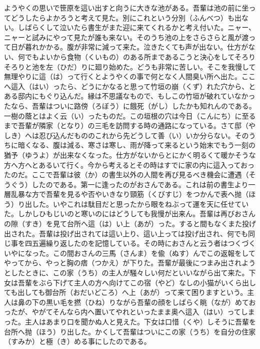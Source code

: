 \documentclass{book}
\begin{document}
ようやくの思いで笹原を這い出すと向うに大きな池がある。吾輩は池の前に坐ってどうしたらよかろうと考えて見た。別にこれという分別（ふんべつ）も出ない。しばらくして泣いたら書生がまた迎に来てくれるかと考え付いた。ニャー、ニャーと試みにやって見たが誰も来ない。そのうち池の上をさらさらと風が渡って日が暮れかかる。腹が非常に減って来た。泣きたくても声が出ない。仕方がない、何でもよいから食物（くいもの）のある所まであるこうと決心をしてそろりそろりと池を左（ひだ）りに廻り始めた。どうも非常に苦しい。そこを我慢して無理やりに這（は）って行くとようやくの事で何となく人間臭い所へ出た。ここへ這入（はい）ったら、どうにかなると思って竹垣の崩（くず）れた穴から、とある邸内にもぐり込んだ。縁は不思議なもので、もしこの竹垣が破れていなかったなら、吾輩はついに路傍（ろぼう）に餓死（がし）したかも知れんのである。一樹の蔭とはよく云（い）ったものだ。この垣根の穴は今日（こんにち）に至るまで吾輩が隣家（となり）の三毛を訪問する時の通路になっている。さて邸（やしき）へは忍び込んだもののこれから先どうして善（い）いか分らない。そのうちに暗くなる、腹は減る、寒さは寒し、雨が降って来るという始末でもう一刻の猶予（ゆうよ）が出来なくなった。仕方がないからとにかく明るくて暖かそうな方へ方へとあるいて行く。今から考えるとその時はすでに家の内に這入っておったのだ。ここで吾輩は彼（か）の書生以外の人間を再び見るべき機会に遭遇（そうぐう）したのである。第一に逢ったのがおさんである。これは前の書生より一層乱暴な方で吾輩を見るや否やいきなり頸筋（くびすじ）をつかんで表へ抛（ほう）り出した。いやこれは駄目だと思ったから眼をねぶって運を天に任せていた。しかしひもじいのと寒いのにはどうしても我慢が出来ん。吾輩は再びおさんの隙（すき）を見て台所へ這（は）い上（あが）った。すると間もなくまた投げ出された。吾輩は投げ出されては這い上り、這い上っては投げ出され、何でも同じ事を四五遍繰り返したのを記憶している。その時におさんと云う者はつくづくいやになった。この間おさんの三馬（さんま）を偸（ぬす）んでこの返報をしてやってから、やっと胸の痞（つかえ）が下りた。吾輩が最後につまみ出されようとしたときに、この家（うち）の主人が騒々しい何だといいながら出て来た。下女は吾輩をぶら下げて主人の方へ向けてこの宿（やど）なしの小猫がいくら出しても出しても御台所（おだいどころ）へ上（あが）って来て困りますという。主人は鼻の下の黒い毛を撚（ひね）りながら吾輩の顔をしばらく眺（なが）めておったが、やがてそんなら内へ置いてやれといったまま奥へ這入（はい）ってしまった。主人はあまり口を聞かぬ人と見えた。下女は口惜（くや）しそうに吾輩を台所へ抛（ほう）り出した。かくして吾輩はついにこの家（うち）を自分の住家（すみか）と極（き）める事にしたのである。\\
\end{document}
